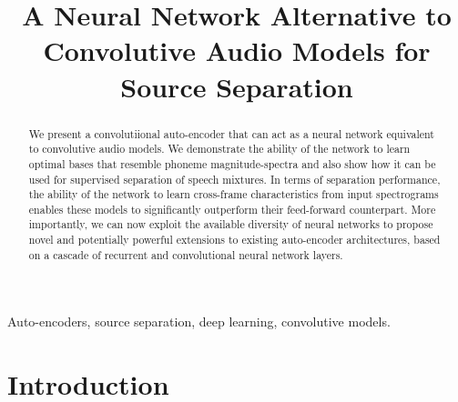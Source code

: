 \documentclass{article}
\title{A Neural Network Alternative to Convolutive Audio Models for Source Separation}
\begin{document}
%

\maketitle
%
\begin{abstract}
We present a convolutiional auto-encoder that can act as a neural network equivalent to convolutive audio models. We demonstrate the ability of the network to learn optimal bases that resemble phoneme magnitude-spectra and also show how it can be used for supervised separation of speech mixtures. In terms of separation performance, the ability of the network to learn cross-frame characteristics from input spectrograms enables these models to significantly outperform their feed-forward counterpart. More importantly, we can now exploit the available diversity of neural networks to propose novel and potentially powerful extensions to existing auto-encoder architectures, based on a cascade of recurrent and convolutional neural network layers. 

\end{abstract}
%
\begin{keywords}
Auto-encoders, source separation, deep learning, convolutive models.
\end{keywords}
%
\section{Introduction}
\label{sec:intro}

\end{document}
